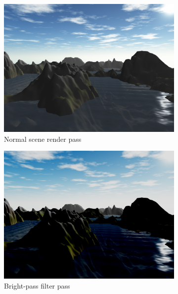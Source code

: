 \documentclass[11pt,a4paper,twoside,openright]{report}
\begin{document}
\begin{figure}[h]
  \centering
  \begin{subfigure}[b]{0.32\textwidth}
    \includegraphics[width=\textwidth]{shader0-no-effect-screenshot.png}
    \caption{Normal scene render pass}
    \label{fig:1stpass}
  \end{subfigure}
  \begin{subfigure}[b]{0.32\textwidth}
    \includegraphics[width=\textwidth]{shader1-brightpass-screenshot.png}
    \caption{Bright-pass filter pass}
    \label{fig:2ndpass}
  \end{subfigure}
  \begin{subfigure}[b]{0.32\textwidth}

\end{subfigure}
\end{figure}
\end{document}
